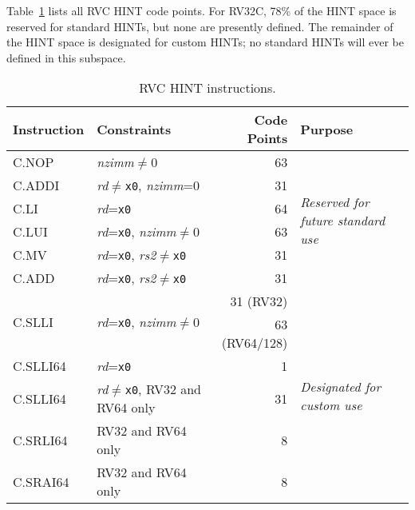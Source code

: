 Table~\ref{tab:rvc-hints} lists all RVC HINT code points.  For RV32C, 78\% of
the HINT space is reserved for standard HINTs, but none are presently defined.
The remainder of the HINT space is designated for custom HINTs; no standard
HINTs will ever be defined in this subspace.

\begin{table}[hbt]
\centering
\begin{tabular}{|l|l|r|l|}
  \hline
  Instruction             & Constraints                                 & Code Points & Purpose \\ \hline \hline
  C.NOP                   & {\em nzimm}$\neq$0                          & 63          & \multirow{6}{*}{\em Reserved for future standard use} \\ \cline{1-3}
  C.ADDI                  & {\em rd}$\neq${\tt x0}, {\em nzimm}=0       & 31          & \\ \cline{1-3}
  C.LI                    & {\em rd}={\tt x0}                           & 64          & \\ \cline{1-3}
  C.LUI                   & {\em rd}={\tt x0}, {\em nzimm}$\neq$0       & 63          & \\ \cline{1-3}
  C.MV                    & {\em rd}={\tt x0}, {\em rs2}$\neq${\tt x0}  & 31          & \\ \cline{1-3}
  C.ADD                   & {\em rd}={\tt x0}, {\em rs2}$\neq${\tt x0}  & 31          & \\ \hline \hline
  \multirow{2}{*}{C.SLLI} & \multirow{2}{*}{{\em rd}={\tt x0}, {\em nzimm}$\neq$0} & 31 (RV32)   & \multirow{6}{*}{\em Designated for custom use} \\
                          &                                             & 63 (RV64/128) & \\ \cline{1-3}
  C.SLLI64                & {\em rd}={\tt x0}                           & 1           & \\ \cline{1-3}
  C.SLLI64                & {\em rd}$\neq${\tt x0}, RV32 and RV64 only  & 31          & \\ \cline{1-3}
  C.SRLI64                & RV32 and RV64 only                          & 8           & \\ \cline{1-3}
  C.SRAI64                & RV32 and RV64 only                          & 8           & \\ \hline
\end{tabular}
\caption{RVC HINT instructions.}
\label{tab:rvc-hints}
\end{table}

